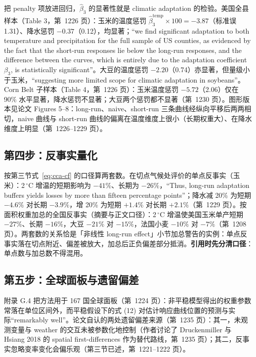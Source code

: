 把 penalty 项放进回归，$\widehat{\beta}_3$ 的显著性就是 climatic adaptation 的检验。美国全县样本（Table 3，第~1226 页）：玉米的温度惩罚 $\widehat{\beta}_3^{\mathrm{temp}}\times 100=-3.87$（标准误 1.31）、降水惩罚 $-0.37$（0.12），均显著；``we find significant adaptation to both temperature and precipitation for the full sample of US counties, as evidenced by the fact that the short-run responses lie below the long-run responses, and the difference between the curves, which is entirely due to the adaptation coefficient $\beta_3$, is statistically significant''\citep[第~1226 页]{merel2021climate}。大豆的温度惩罚 $-2.20$（0.74）亦显著，但量级小于玉米，``suggesting more limited scope for climatic adaptation in soybeans''\citep[第~1230 页]{merel2021climate}。Corn Belt 子样本（Table 4，第~1226 页）：玉米温度惩罚 $-5.72$（2.06）仅在 90\% 水平显著，降水惩罚不显著；大豆两个惩罚都不显著（第~1230 页）。图形版本见论文 Figures 5--8：long-run、naive、short-run 三条曲线经纵向平移后两两相切，naive 曲线与 short-run 曲线的偏离在温度维度上很小（长期权重大）、在降水维度上明显（第~1226--1229 页）。

\subsection{第四步：反事实量化}

按第三节式~\ref{eq:cca-cf} 的口径算两套数。在切点气候处评价的单点反事实（玉米）：2\,$^\circ$C 增温的短期影响为 $-41\%$、长期为 $-26\%$，``Thus, long-run adaptation buffers yields losses by more than fifteen percentage points''\citep[第~1228 页]{merel2021climate}；降水减 20\% 为短期 $-4.6\%$ 对长期 $-3.9\%$，增 20\% 为短期 $+1.4\%$ 对长期 $+2.1\%$（第~1229 页）。按面积权重加总的全国反事实（摘要与正文口径）：2\,$^\circ$C 增温使美国玉米单产短期 $-27\%$、长期 $-16\%$，大豆 $-21\%$ 对 $-15\%$，法国小麦 $-10\%$ 对 $-7\%$（第~1208 页）。两套数的关系恰是「非线性 long-run effect」小节加总警告的实例：单点反事实落在切点附近、偏差被放大，加总后正负偏差部分抵消。\textbf{引用时先分清口径}：单点数与加总数不得混用。

\subsection{第五步：全球面板与遗留偏差}

附录 G.4 把方法用于 167 国全球面板（第~1224 页）：非平稳模型得出的权重参数常落在单位区间外，而平稳假设下的式 (12) 对估计响应曲线位置的预测与实际``remarkably well''\citep[第~1223 页]{merel2021climate}。论文自认的两处遗留偏差来源（第~1235 页）：其一，未观测变量与 weather 的交互未被参数化地控制（作者讨论了 Druckenmiller 与 Hsiang 2018 的 spatial first-differences 作为替代路线，第~1235 页）；其二，反事实忽略变率变化会偏乐观（第三节已述，第~1221--1222 页）。


